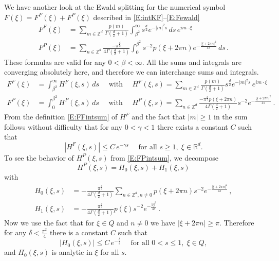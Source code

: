 \documentclass[12pt]{amsart}
\theoremstyle{definition}
\theoremstyle{remark}
\numberwithin{equation}{section}
\newcommand\R{{\mathbb R}}
\newcommand\Z{{\mathbb Z}}
\begin{document}
We have another look at the Ewald splitting for the numerical symbol $F(\xi)=F^{F}(\xi)+F^{P}(\xi)$ described in \eqref{E:intKF}--\eqref{E:Fewald}
\begin{align}
\label{E:FFsumint}
 F^{F}(\xi) &= \sum_{m\in\Z^{d}} 
    \frac{p(m)}{\Gamma(\frac d2+1)}\int_{\beta^{2}}^{\infty} s^{\frac d2}e^{-|m|^{2}s}\,ds
    \,e^{im\cdot \xi} \\
\label{E:FPsumint}
 F^{P}(\xi) &= \sum_{n\in\Z^{d}}
    \frac{-\pi^{\frac d2}}{4\Gamma(\frac d2+1)}\int_{0}^{\beta^{2}}\!\!\!\! s^{-2}p(\xi+2\pi n)e^{-\frac{|\xi+2\pi n|^{2}}{4s}}\,ds\,.
\end{align}
These formulas are valid for any $0<\beta<\infty$. All the sums and integrals are converging absolutely here, and therefore we can interchange sums and integrals.
\begin{align}
\label{E:FFintsum}
 F^{F}(\xi) &= \int_{\beta^{2}}^{\infty}\!\!\! H^{F}(\xi,s)\,ds \quad\mbox{ with }\quad
 H^{F}(\xi,s) = \sum_{m\in\Z^{d}} 
    \frac{p(m)}{\Gamma(\frac d2+1)} s^{\frac d2}e^{-|m|^{2}s}
    \,e^{im\cdot \xi}\\
\label{E:FPintsum}
 F^{P}(\xi) &= \int_{0}^{\beta^{2}}\!\!\! H^{P}(\xi,s)\,ds \quad\mbox{ with }\quad
 H^{P}(\xi,s) =
 \sum_{n\in\Z^{d}}
    \frac{-\pi^{\frac d2}p(\xi+2\pi n)}{4\Gamma(\frac d2+1)} s^{-2}e^{-\frac{|\xi+2\pi n|^{2}}{4s}}\,.
\end{align}
From the definition \eqref{E:FFintsum} of $H^{F}$ and the fact that $|m|\ge1$ in the sum follows without difficulty that for any $0<\gamma<1$ there exists a constant $C$ such that
\begin{equation}
\label{E:HFstoinf} |H^{F}(\xi,s)| \le C\,e^{-\gamma s} \quad\mbox{ for all }s\ge1,\; \xi\in\R^{d}.
\end{equation}
To see the behavior of $H^{P}(\xi,s)$  from \eqref{E:FPintsum}, we decompose
$$
 H^{P}(\xi,s) = H_{0}(\xi,s) + H_{1}(\xi,s)
$$
with 
\begin{align}
\label{E:H0} 
 H_{0}(\xi,s) &= -\tfrac{\pi^{\frac d2}}{4\Gamma(\frac d2+1)}
 \!\!\!
  \sum_{n\in\Z^{d},n\ne0} \!\!\!
    p(\xi+2\pi n) s^{-2}e^{-\frac{|\xi+2\pi n|^{2}}{4s}}\,,\\
\label{E:H1}
  H_{1}(\xi,s) &= -\tfrac{\pi^{\frac d2}}{4\Gamma(\frac d2+1)}
     p(\xi) s^{-2}e^{-\frac{|\xi|^{2}}{4s}}\,.
\end{align}
Now we use the fact that for $\xi\in Q$ and $n\ne0$ we have $|\xi+2\pi n|\ge\pi$. 
Therefore for any $\delta<\frac{\pi^{2}}{4}$ there is a constant $C$ such that
\begin{equation}
\label{E:H0at0}
 |H_{0}(\xi,s)| \le C\, e^{-\frac\delta s} \quad\mbox{ for all }0<s\le1,\; \xi\in Q,
\end{equation}
and $H_{0}(\xi,s)$ is analytic in $\xi$ for all $s$.
\end{document}
